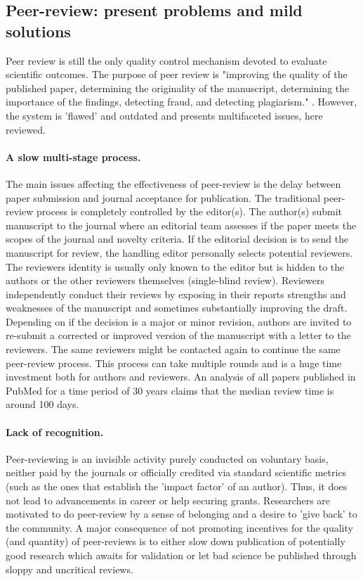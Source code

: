 \documentclass[runningheads]{llncs}
\begin{document}
\subsection{Peer-review: present problems and mild solutions}
Peer review is still the only quality control mechanism devoted to evaluate scientific outcomes. The purpose of peer review is "improving the quality of the published paper, determining the originality of the manuscript, determining the importance of the findings, detecting fraud, and detecting plagiarism." \cite{Gropp-PeerRevStress}. However, the system is 'ﬂawed' and outdated \cite{Smith2006} and presents multifaceted issues, here reviewed.
\paragraph{A slow multi-stage process.} The main issues affecting the effectiveness of peer-review is the delay between paper submission and journal acceptance for publication. The traditional peer-review process is completely controlled by the editor(s). The author(s) submit manuscript to the journal where an editorial team assesses if the paper meets the scopes of the journal and novelty criteria. If the editorial decision is to send the manuscript for review, the handling editor personally selects potential reviewers. The reviewers identity is usually only known to the editor but is hidden to the authors or the other reviewers themselves (single-blind review). Reviewers independently conduct their reviews by exposing in their reports strengths and weaknesses of the manuscript and sometimes substantially improving the draft. Depending on if the decision is a major or minor revision, authors are invited to re-submit a corrected or improved version of the manuscript with a letter to the reviewers. The same reviewers might be contacted again to continue the same peer-review process. This process can take multiple rounds and is a huge time investment both for authors and reviewers. An analysis of all papers published in PubMed for a time period of 30 years claims that the median review time is around 100 days\cite{Kendall-peerrev}.
\paragraph{Lack of recognition.} Peer-reviewing is an invisible activity purely conducted on voluntary basis, neither paid by the journals or officially credited via standard scientific metrics (such as the ones that establish the 'impact factor' of an author). Thus, it does not lead to advancements in career or help securing grants. Researchers are motivated to do peer-review by a sense of belonging and a desire to 'give back' to the community. A major consequence of not promoting incentives for the quality (and quantity) of peer-reviews is to either slow down publication of potentially good research which awaits for validation or let bad science be published through sloppy and uncritical reviews.
\end{document}
